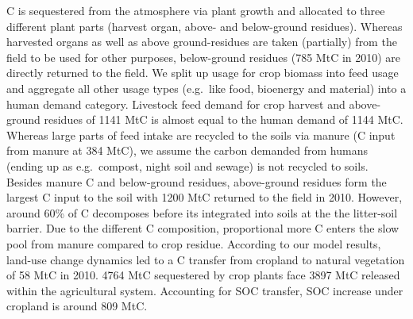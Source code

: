 \documentclass[gc, manuscript]{copernicus}
\begin{document}
C is sequestered from the atmosphere via plant growth and allocated to three different plant parts (harvest organ, above- and below-ground residues). Whereas harvested organs as well as above ground-residues are taken (partially) from the field to be used for other purposes, below-ground residues (785 MtC in 2010) are directly returned to the field. We split up usage for crop biomass into feed usage and aggregate all other usage types (e.g.~like food, bioenergy and material) into a human demand category. Livestock feed demand for crop harvest and above-ground residues of 1141 MtC is almost equal to the human demand of 1144 MtC. Whereas large parts of feed intake are recycled to the soils via manure (C input from manure at 384 MtC), we assume the carbon demanded from humans (ending up as e.g.~compost, night soil and sewage) is not recycled to soils. Besides manure C and below-ground residues, above-ground residues form the largest C input to the soil with 1200 MtC returned to the field in 2010. However, around 60\% of C decomposes before its integrated into soils at the the litter-soil barrier. Due to the different C composition, proportional more C enters the slow pool from manure compared to crop residue. According to our model results, land-use change dynamics led to a C transfer from cropland to natural vegetation of 58 MtC in 2010. 4764 MtC sequestered by crop plants face 3897 MtC released within the agricultural system. Accounting for SOC transfer, SOC increase under cropland is around 809 MtC.
\end{document}
